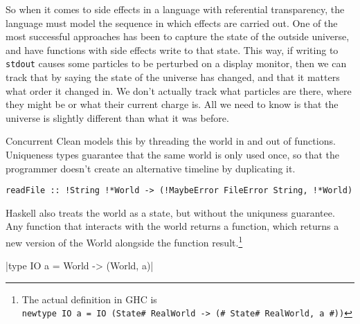 \documentclass{report}
\begin{document}
So when it comes to side effects in a language with referential transparency,
the language must model the sequence in which effects are carried out. One of
the most successful approaches has been to capture the state of the outside
universe, and have functions with side effects write to that state. This way, if
writing to \texttt{stdout} causes some particles to be perturbed on a display
monitor, then we can track that by saying the state of the universe has changed,
and that it matters what order it changed in. We don't actually track what
particles are there, where they might be or what their current charge is. All we
need to know is that the universe is slightly different than what it was before.

Concurrent Clean models this by threading the world in and out of
functions. Uniqueness types guarantee that the same world is only used once, so
that the programmer doesn't create an alternative timeline by duplicating it.
\begin{verbatim}
readFile :: !String !*World -> (!MaybeError FileError String, !*World)
\end{verbatim}
Haskell also treats the world as a state, but without the uniquness guarantee.
Any function that interacts with the world returns a function, which returns a
new version of the World alongside the function result.\footnote{The actual
  definition in GHC is \\ \texttt{newtype IO a = IO (State#
    RealWorld -> (# State# RealWorld, a #))}}

|type IO a = World -> (World, a)|
\end{document}
